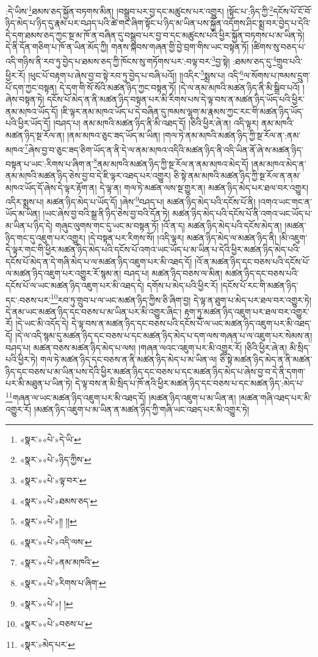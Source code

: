 :དེ་ཡིས་\footnote{«སྣར་»«པེ་»དེ་ཡི་}ཐམས་ཅད་སྐྱོན་བཏགས་མིན། །བསྒྲུབ་པར་བྱ་དང་མཚུངས་པར་འགྱུར། །སྟོང་པ་:ཉིད་ཀྱི་\footnote{«སྣར་»«པེ་»ཉིད་ཀྱིས་}དངོས་པོ་ངོ་བོ་ཉིད་མེད་པ་ཉིད་དུ་རྣམ་པར་བཤད་པའི་ཚེ་གང་ཞིག་སྟོང་པ་ཉིད་མ་ཡིན་པས་སྐྱོན་འདོགས་ཤིང་སྨྲ་བར་བྱེད་པ་དེའི་དེ་དག་ཐམས་ཅད་ཀྱང་སྔ་མ་ཁོ་ན་བཞིན་དུ་བསྒྲུབ་པར་བྱ་བ་དང་མཚུངས་པའི་ཕྱིར་སྐྱོན་བཏགས་པ་མ་ཡིན་ཏེ། དེ་ནི་དོན་གཅིག་པ་ཁོ་ན་ཡིན་མོད་ཀྱི། གནས་སྐབས་གཞན་གྱི་བྱེ་བྲག་གིས་ཡང་བསྟན་ཏོ། །ཚིགས་སུ་བཅད་པ་འདི་གཉིས་ནི་རབ་ཏུ་བྱེད་པ་ཐམས་ཅད་ཀྱི་ཁོངས་སུ་གཏོགས་པར་:བལྟ་བར་\footnote{«སྣར་»«པེ་»ལྟ་བར་}བྱ་སྟེ། :ཐམས་ཅད་དུ་\footnote{«སྣར་»«པེ་»ཐམས་ཅད་}གྲུབ་པའི་ཕྱིར་རོ། །ཕུང་པོ་བརྟག་པ་ཞེས་བྱ་བ་སྟེ་རབ་ཏུ་བྱེད་པ་བཞི་པའོ།། །།འདིར་\footnote{«སྣར་»«པེ་»།། །།}སྨྲས་པ། འདི་\footnote{«སྣར་»«པེ་»འདི་ལས་}ལ་སོགས་པ་ཁམས་དྲུག་པོ་དག་ཀྱང་བསྟན། དེ་དག་གི་སོ་སོའི་མཚན་ཉིད་ཀྱང་བསྟན་ཏོ། །དེ་ལ་ནམ་མཁའི་མཚན་ཉིད་ནི་མི་སྒྲིབ་པའོ། །ཞེས་བསྟན་ཏེ། དངོས་པོ་མེད་ན་ནི་མཚན་ཉིད་བསྟན་པར་མི་རིགས་པས་དེ་ལྟ་བས་ན་མཚན་ཉིད་ཡོད་པའི་ཕྱིར་ནམ་མཁའ་ཡོད་དོ། །ཇི་ལྟར་ནམ་མཁའ་ཡོད་པ་དེ་བཞིན་དུ་ཁམས་ལྷག་མ་རྣམས་ཀྱང་རང་གི་མཚན་ཉིད་ཡོད་པའི་ཕྱིར་ཡོད་དོ། །བཤད་པ། ནམ་མཁའི་མཚན་ཉིད་ནི་མི་འཐད་དོ། །ཅིའི་ཕྱིར་ཞེ་ན། འདི་ལྟར། ནམ་མཁའི་མཚན་ཉིད་སྔ་རོལ་ན། །ནམ་མཁའ་ཅུང་ཟད་ཡོད་མ་ཡིན། །གལ་ཏེ་ནམ་མཁའི་མཚན་ཉིད་ཀྱི་སྔ་རོལ་ན་:ནམ་མཁའ་\footnote{«སྣར་»«པེ་»ནམ་མཁའི་}ཞེས་བྱ་བ་ཅུང་ཟད་ཅིག་ཡོད་ན་ནི་དེ་ལ་ནམ་མཁའ་འདིའི་མཚན་ཉིད་ནི་འདི་ཡིན་ནོ་ཞེ་ས་མཚན་ཉིད་བསྟན་པ་ཡང་:རིགས་པ་ཞིག་ན་\footnote{«སྣར་»«པེ་»རིགས་པ་ཞིག་}ནམ་མཁའི་མཚན་ཉིད་ཀྱི་སྔ་རོལ་ན་ནམ་མཁའ་མེད་དོ། །ནམ་མཁའ་མེད་ན་ནམ་མཁའི་མཚན་ཉིད་ཅེས་བྱ་བ་དེ་ཇི་ལྟར་འཐད་པར་འགྱུར། ཅི་སྟེ་ནམ་མཁའི་མཚན་ཉིད་ཀྱི་སྔ་རོལ་ན་ནམ་མཁའ་ཡོད་དོ་ཞེས་དེ་ལྟར་རྟོག་ན། དེ་ལྟ་ན། གལ་ཏེ་མཚན་ལས་སྔ་གྱུར་ན། མཚན་ཉིད་མེད་པར་ཐལ་བར་འགྱུར། འདིར་སྨྲས་པ། མཚན་ཉིད་མེད་པ་ཡོད་དོ། །ཞེས་\footnote{«སྣར་»«པེ་»། །}བཤད་པ། མཚན་ཉིད་མེད་པའི་དངོས་པོ་ནི། །འགའ་ཡང་གང་ན་ཡོད་མ་ཡིན། །ཡང་ཞེས་བྱ་བའི་སྒྲ་ནི་ཉིད་ཅེས་བྱ་བའི་དོན་ཏེ། མཚན་ཉིད་མེད་པའི་དངོས་པོ་ནི་འགའ་ཡང་ཡོད་པ་མ་ཡིན་པ་ཉིད་དེ། གཞུང་ལུགས་གང་དུ་ཡང་མ་བསྟན་ཏོ། །འོ་ན་ད། མཚན་ཉིད་མེད་པའི་དངོས་མེད་ན། །མཚན་ཉིད་གང་དུ་འཇུག་པར་འགྱུར། །དེ་བསྟན་པར་རིགས་སོ། །འདི་ལྟར། མཚན་ཉིད་མེད་ལ་མཚན་ཉིད་ནི། །མི་འཇུག་དེ་ལྟར་གང་གི་ཕྱིར་མཚན་ཉིད་མེད་པའི་དངོས་པོ་འགའ་ཡང་ཡོད་པ་མ་ཡིན་པ་དེའི་ཕྱིར་མཚན་ཉིད་མེད་པའི་དངོས་པོ་མེད་ན་དེ་གཞི་མེད་པ་ལ་མཚན་ཉིད་འཇུག་པར་མི་འཐད་དོ། །འོ་ན་མཚན་ཉིད་དང་བཅས་པའི་དངོས་པོ་ལ་མཚན་ཉིད་འཇུག་པར་འགྱུར་རོ་སྙམ་ན། བཤད་པ། མཚན་ཉིད་བཅས་ལ་མིན། མཚན་ཉིད་དང་བཅས་པའི་དངོས་པོ་ལ་ཡང་མཚན་ཉིད་འཇུག་པར་མི་འཐད་དེ། དགོས་པ་མེད་པའི་ཕྱིར་རོ། །དངོས་པོ་རང་གི་མཚན་ཉིད་དང་:བཅས་པར་\footnote{«སྣར་»«པེ་»བཅས་པ་}རབ་ཏུ་གྲུབ་པ་ལ་ཡང་མཚན་ཉིད་ཀྱིས་ཅི་ཞིག་བྱ། དེ་ལྟ་ན་ཐུག་པ་མེད་པར་ཐལ་བར་འགྱུར་ཏེ། དེ་ནམ་ཡང་མཚན་ཉིད་དང་བཅས་པ་མ་ཡིན་པར་མི་འགྱུར་ཞིང་། རྟག་ཏུ་མཚན་ཉིད་འཇུག་པར་ཐལ་བར་འགྱུར་རོ། །དེ་ཡང་མི་འདོད་དེ། དེ་ལྟ་བས་ན་མཚན་ཉིད་དང་བཅས་པའི་དངོས་པོ་ལ་ཡང་མཚན་ཉིད་འཇུག་པར་མི་འཐད་དོ། །དེ་ལ་འདི་སྙམ་དུ་མཚན་ཉིད་དང་བཅས་པ་དང་མཚན་ཉིད་མེད་པ་དག་ལས་གཞན་པ་ལ་འཇུག་པར་སེམས་ན། བཤད་པ། མཚན་བཅས་མཚན་ཉིད་མེད་པ་ལས། །གཞན་ལའང་འཇུག་པར་མི་འགྱུར་རོ། །ཅིའི་ཕྱིར་ཞེ་ན། མི་སྲིད་པའི་ཕྱིར་ཏེ། གལ་ཏེ་མཚན་ཉིད་དང་བཅས་ན་ནི་མཚན་ཉིད་མེད་པ་མ་ཡིན་ལ། ཅི་སྟེ་མཚན་ཉིད་མེད་ན་ནི་མཚན་ཉིད་དང་བཅས་པ་མ་ཡིན་པས་དེའི་ཕྱིར་མཚན་ཉིད་དང་བཅས་པ་དང་མཚན་ཉིད་མེད་པ་ཞེས་བྱ་བ་དེ་ནི་དགག་པར་མི་མཐུན་པ་ཡིན་ཏེ། དེ་ལྟ་བས་ན་མི་སྲིད་པ་ཁོ་ནའི་ཕྱིར་མཚན་ཉིད་དང་བཅས་པ་དང་མཚན་ཉིད་:མེད་པ་\footnote{«སྣར་»མེད་པར་}གཞན་ལ་ཡང་མཚན་ཉིད་འཇུག་པར་མི་འཐད་དོ། །མཚན་ཉིད་འཇུག་པ་མ་ཡིན་ན། །མཚན་གཞི་འཐད་པར་མི་འགྱུར་རོ། །མཚན་ཉིད་འཇུག་པ་མ་ཡིན་ན་མཚན་ཉིད་ཀྱི་གཞི་ཡང་འཐད་པར་མི་འགྱུར་ཏེ། 